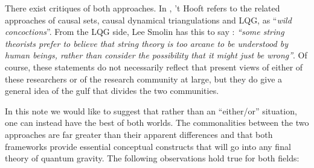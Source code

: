 \documentclass[a4paper]{article}
\begin{document}
There exist critiques of both approaches. In \cite[Sec. 4, pg 6]{t-Hooft2016Natures}, 't Hooft refers to the related approaches of causal sets, causal dynamical triangulations and LQG, as ``\emph{wild concoctions}''. From the LQG side, Lee Smolin has this to say \cite{Smolin2006The-trouble}: \emph{``some string theorists prefer to believe that string theory is too arcane to be understood by human beings, rather than consider the possibility that it might just be wrong''}. Of course, these statements do not necessarily reflect that present views of either of these researchers or of the research community at large, but they do give a general idea of the gulf that divides the two communities.

In this note we would like to suggest that rather than an ``either/or'' situation, one can instead have the best of both worlds. The commonalities between the two approaches are far greater than their apparent differences and that both frameworks provide essential conceptual constructs that will go into any final theory of quantum gravity. The following observations hold true for both fields:
\end{document}
